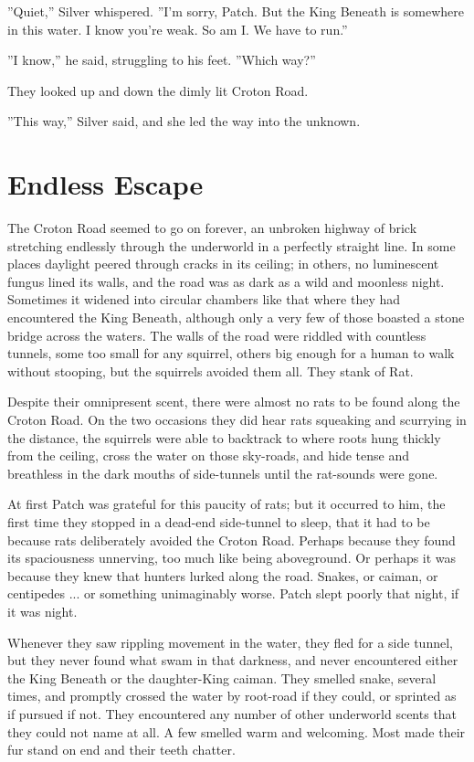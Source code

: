 \documentclass[12pt]{book}
\begin{document}
''Quiet,'' Silver whispered. ''I'm sorry, Patch. But the King Beneath is somewhere in this water. I know you're weak. So am I. We have to run.''

''I know,'' he said, struggling to his feet. ''Which way?''

They looked up and down the dimly lit Croton Road.

''This way,'' Silver said, and she led the way into the unknown.


\section{Endless Escape}

The Croton Road seemed to go on forever, an unbroken highway of brick stretching endlessly through the underworld in a perfectly straight line. In some places daylight peered through cracks in its ceiling; in others, no luminescent fungus lined its walls, and the road was as dark as a wild and moonless night. Sometimes it widened into circular chambers like that where they had encountered the King Beneath, although only a very few of those boasted a stone bridge across the waters. The walls of the road were riddled with countless tunnels, some too small for any squirrel, others big enough for a human to walk without stooping, but the squirrels avoided them all. They stank of Rat.

Despite their omnipresent scent, there were almost no rats to be found along the Croton Road. On the two occasions they did hear rats squeaking and scurrying in the distance, the squirrels were able to backtrack to where roots hung thickly from the ceiling, cross the water on those sky-roads, and hide tense and breathless in the dark mouths of side-tunnels until the rat-sounds were gone.

At first Patch was grateful for this paucity of rats; but it occurred to him, the first time they stopped in a dead-end side-tunnel to sleep, that it had to be because rats deliberately avoided the Croton Road. Perhaps because they found its spaciousness unnerving, too much like being aboveground. Or perhaps it was because they knew that hunters lurked along the road. Snakes, or caiman, or centipedes ... or something unimaginably worse. Patch slept poorly that night, if it was night.

Whenever they saw rippling movement in the water, they fled for a side tunnel, but they never found what swam in that darkness, and never encountered either the King Beneath or the daughter-King caiman. They smelled snake, several times, and promptly crossed the water by root-road if they could, or sprinted as if pursued if not. They encountered any number of other underworld scents that they could not name at all. A few smelled warm and welcoming. Most made their fur stand on end and their teeth chatter.
\end{document}
